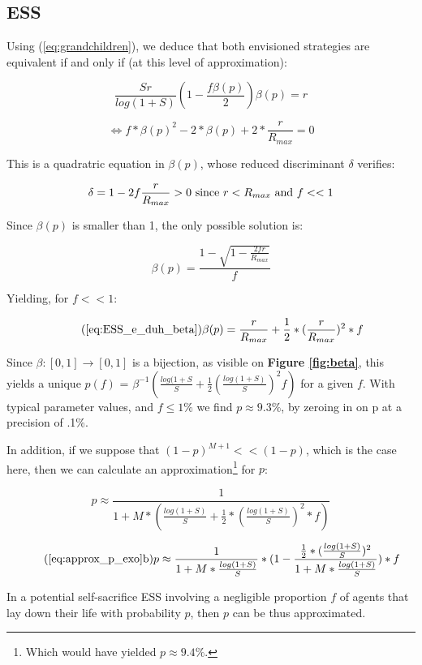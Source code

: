 \documentclass[a4paper,12pt]{report}
\begin{document}
\subsection{ESS}
\label{ss_e_a:ESS}

Using (\ref{eq:grandchildren}), we deduce that both envisioned strategies are equivalent if
and only if (at this level of approximation):

\[\frac{Sr}{log(1+S)}(1-\frac{f\beta(p)}{2})\beta(p)=r  \]

\begin{equation}
    \label{eq:trinome_beta}
    \iff f*\beta(p)^2 - 2*\beta(p) + 2*\frac{r}{R_{max}} = 0
\end{equation}

This is a quadratric equation in $\beta(p)$, whose reduced discriminant $\delta$ verifies:

\[\delta = 1 - 2f\frac{r}{R_{max}} > 0 \textnormal{ since } 
r<R_{max} \textnormal{ and } f << 1 
\]

Since $\beta(p)$ is smaller than 1, the
only possible solution is:

\[\beta(p) = \frac{1 - \sqrt{1-\frac{2fr}{R_{max}}}}{f} \]

Yielding, for $f << 1$:

\begin{equation}\tag{\ref{eq:ESS_e_duh_beta}}
    \beta(p) = \frac{r}{R_{max}}+\frac{1}{2}*(\frac{r}{R_{max}})^2*f
\end{equation}


Since $\beta \colon [0,1] \to [0,1]$ is a bijection, as visible on
 \textbf{Figure \ref{fig:beta}}, 
 this yields a unique $p(f)$ = $\beta^{-1}(\frac{log(1+S}{S} + \frac{1}{2}(\frac{log(1+S)}{S})^2f)$
 for a given $f$. With typical parameter values, and $f\leq 1\%$
 we find $p \approx 9.3\%$, by zeroing in on p at a precision of .1\%.

 In addition, if we suppose that $(1-p)^{M+1} << (1-p)$, which is the case here, then we
 can calculate an approximation\footnote{Which would have yielded
 $p \approx 9.4\%$.} for $p$:

 \[p \approx \frac{1}{1+M*(\frac{log(1+S)}{S} + \frac{1}{2}*(\frac{log(1+S)}{S})^2*f)}\]


 \begin{equation}
    \tag{\ref{eq:approx_p_exo}b}
    p \approx \frac{1}{1+M*\frac{log(1+S)}{S}}*
    (1- \frac{\frac{1}{2}*
    (\frac{log(1+S)}{S})^2}{1+M*\frac{log(1+S)}{S}})*f
    \label{eq:p_grr_approx}
    \end{equation}



 In a potential self-sacrifice ESS involving a negligible proportion $f$ of agents that lay down their
 life with probability $p$, then $p$ can be thus approximated.


 
\end{document}
